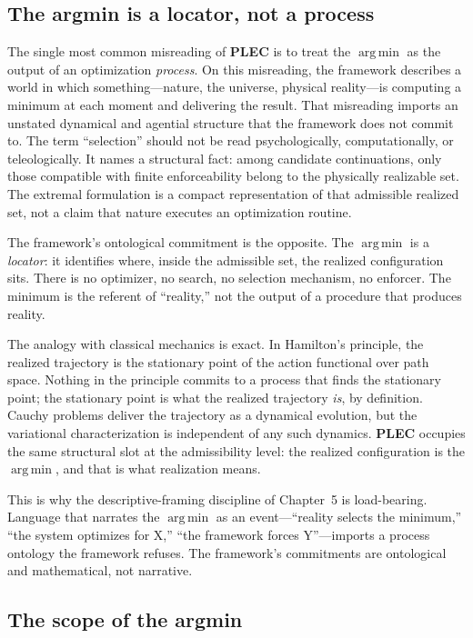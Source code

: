 \documentclass[11pt]{article}
\newcommand{\PLEC}{\textbf{PLEC}}
\newcommand{\argmin}{\mathop{\mathrm{arg\,min}}}
\begin{document}
\subsection{The argmin is a locator, not a process}\label{sec:argmin_locator}

The single most common misreading of \PLEC{} is to treat the $\argmin$ as the output of an optimization \emph{process}. On this misreading, the framework describes a world in which something---nature, the universe, physical reality---is computing a minimum at each moment and delivering the result. That misreading imports an unstated dynamical and agential structure that the framework does not commit to. The term ``selection'' should not be read psychologically, computationally, or teleologically. It names a structural fact: among candidate continuations, only those compatible with finite enforceability belong to the physically realizable set. The extremal formulation is a compact representation of that admissible realized set, not a claim that nature executes an optimization routine.

The framework's ontological commitment is the opposite. The $\argmin$ is a \emph{locator}: it identifies where, inside the admissible set, the realized configuration sits. There is no optimizer, no search, no selection mechanism, no enforcer. The minimum is the referent of ``reality,'' not the output of a procedure that produces reality.

The analogy with classical mechanics is exact. In Hamilton's principle, the realized trajectory is the stationary point of the action functional over path space. Nothing in the principle commits to a process that finds the stationary point; the stationary point is what the realized trajectory \emph{is}, by definition. Cauchy problems deliver the trajectory as a dynamical evolution, but the variational characterization is independent of any such dynamics. \PLEC{} occupies the same structural slot at the admissibility level: the realized configuration is the $\argmin$, and that is what realization means.

This is why the descriptive-framing discipline of Chapter~5 is load-bearing. Language that narrates the $\argmin$ as an event---``reality selects the minimum,'' ``the system optimizes for X,'' ``the framework forces Y''---imports a process ontology the framework refuses. The framework's commitments are ontological and mathematical, not narrative.

\subsection{The scope of the argmin}\label{sec:argmin_scope}
\end{document}
